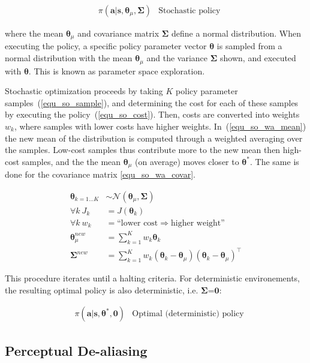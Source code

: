 \documentclass[12pt]{article}
\newcommand{\mymath}[1]{\ensuremath{#1}\xspace}
\newcommand{\act}    {\mymath{\mathbf{a}}}
\newcommand{\sta}    {\mymath{\mathbf{s}}}
\newcommand{\app}    {\mymath{\bm{\theta}}}
\newcommand{\covar}  {\mymath{\bm{\Sigma}}}
\begin{document}
\begin{align}
& \pi(\act|\sta,\app_\mu,\covar) & \mbox{Stochastic policy} \label{eq:stoch}
\end{align}

where the mean $\app_\mu$ and covariance matrix \covar  define a normal distribution. When executing the policy, a specific policy parameter vector \app is sampled from a normal distribution with the mean $\app_\mu$ and the variance $\covar$ shown, and executed with \app. This is known as parameter space exploration. 

Stochastic optimization proceeds by taking $K$ policy parameter samples~(\ref{equ_so_sample}), and determining the cost for each of these samples by executing the policy~(\ref{equ_so_cost}). Then, costs are converted into weights $w_k$, where samples with lower costs have higher weights. In~(\ref{equ_so_wa_mean}) the new mean of the distribution is computed through a weighted averaging over the samples. Low-cost samples thus contribute more to the new mean then high-cost samples, and the the mean $\app_\mu$ (on average) moves closer to $\app^*$. The same is done for the covariance matrix \eqref{equ_so_wa_covar}.

\begin{align}
\app_{k=1\dots K} & {\sim}\mathcal{N}({\app_\mu},{\covar})\label{equ_so_sample}\\
\forall k~J_k & = J(\app_k) \label{equ_so_cost}\\
\forall k~w_k & = \mbox{``lower cost} \Rightarrow \mbox{higher weight''}\label{equ_so_cost_to_w}\\
\app_\mu^{new} & = \sum_{k=1}^{K} w_k \app_k\label{equ_so_wa_mean}\\
\covar^{new} & = \sum_{k=1}^{K}w_k(\app_k-\app_\mu)(\app_k-\app_\mu)^\intercal\label{equ_so_wa_covar}
\end{align}

This procedure iterates until a halting criteria. For deterministic environements, the resulting optimal policy is also deterministic, i.e. \covar=$\mathbf{0}$:

\begin{align}
& \pi(\act|\sta,\app^*,\mathbf{0}) & \mbox{Optimal (deterministic) policy} \label{eq:stoch_opt}
\end{align}

\subsection{Perceptual De-aliasing}
\end{document}
